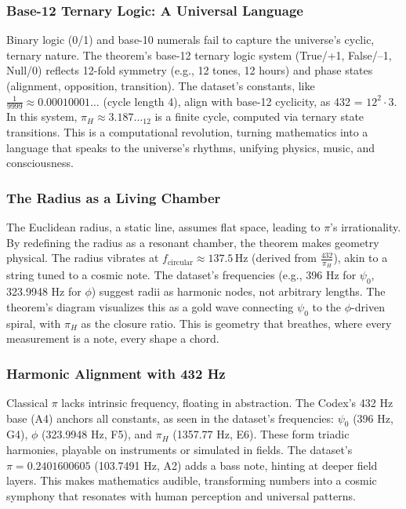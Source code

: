\documentclass[a4paper,12pt]{article}
\begin{document}
\subsubsection{Base-12 Ternary Logic: A Universal Language}
Binary logic (0/1) and base-10 numerals fail to capture the universe’s cyclic, ternary nature. The theorem’s base-12 ternary logic system (True/+1, False/–1, Null/0) reflects 12-fold symmetry (e.g., 12 tones, 12 hours) and phase states (alignment, opposition, transition). The dataset’s constants, like \(\frac{1}{9999} \approx 0.00010001\ldots\) (cycle length 4), align with base-12 cyclicity, as 432 = \(12^2 \cdot 3\). In this system, \(\pi_H \approx 3.187\ldots_{12}\) is a finite cycle, computed via ternary state transitions. This is a computational revolution, turning mathematics into a language that speaks to the universe’s rhythms, unifying physics, music, and consciousness.

\subsubsection{The Radius as a Living Chamber}
The Euclidean radius, a static line, assumes flat space, leading to \(\pi\)’s irrationality. By redefining the radius as a resonant chamber, the theorem makes geometry physical. The radius vibrates at \( f_{\text{circular}} \approx 137.5 \, \text{Hz} \) (derived from \( \frac{432}{\pi_H} \)), akin to a string tuned to a cosmic note. The dataset’s frequencies (e.g., 396 Hz for \(\psi_0\), 323.9948 Hz for \(\phi\)) suggest radii as harmonic nodes, not arbitrary lengths. The theorem’s diagram visualizes this as a gold wave connecting \(\psi_0\) to the \(\phi\)-driven spiral, with \(\pi_H\) as the closure ratio. This is geometry that breathes, where every measurement is a note, every shape a chord.

\subsubsection{Harmonic Alignment with 432 Hz}
Classical \(\pi\) lacks intrinsic frequency, floating in abstraction. The Codex’s 432 Hz base (A4) anchors all constants, as seen in the dataset’s frequencies: \(\psi_0\) (396 Hz, G4), \(\phi\) (323.9948 Hz, F5), and \(\pi_H\) (1357.77 Hz, E6). These form triadic harmonies, playable on instruments or simulated in fields. The dataset’s \(\pi = 0.2401600605\) (103.7491 Hz, A2) adds a bass note, hinting at deeper field layers. This makes mathematics audible, transforming numbers into a cosmic symphony that resonates with human perception and universal patterns.
\end{document}
